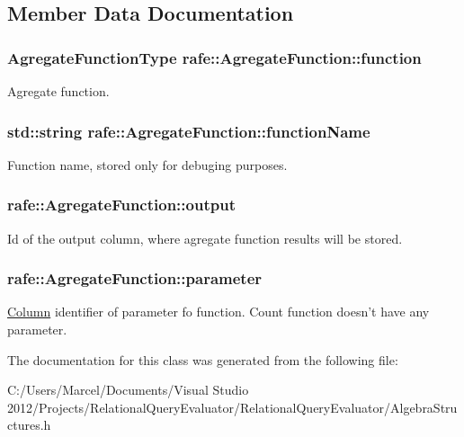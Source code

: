 \subsection{Member Data Documentation}
\hypertarget{classrafe_1_1_agregate_function_a9055ffba2605e99d0ca5362b9b5c7437}{
\subsubsection[{function}]{\setlength{\rightskip}{0pt plus 5cm}Agregate\+Function\+Type rafe\+::\+Agregate\+Function\+::function}}\label{classrafe_1_1_agregate_function_a9055ffba2605e99d0ca5362b9b5c7437}
Agregate function. \hypertarget{classrafe_1_1_agregate_function_a0b3dc806bca42c5ce5525441025166f0}{
\subsubsection[{function\+Name}]{\setlength{\rightskip}{0pt plus 5cm}std\+::string rafe\+::\+Agregate\+Function\+::function\+Name}}\label{classrafe_1_1_agregate_function_a0b3dc806bca42c5ce5525441025166f0}
Function name, stored only for debuging purposes. \hypertarget{classrafe_1_1_agregate_function_ad01da78516417600b5fa40418a5d2cb6}{
\subsubsection[{output}]{ rafe\+::\+Agregate\+Function\+::output}}\label{classrafe_1_1_agregate_function_ad01da78516417600b5fa40418a5d2cb6}
Id of the output column, where agregate function results will be stored. \hypertarget{classrafe_1_1_agregate_function_ab7cc5507a807035e2a35fbba2fc650d6}{
\subsubsection[{parameter}]{ rafe\+::\+Agregate\+Function\+::parameter}}\label{classrafe_1_1_agregate_function_ab7cc5507a807035e2a35fbba2fc650d6}
\hyperlink{classrafe_1_1_column}{Column} identifier of parameter fo function. Count function doesn't have any parameter. 

The documentation for this class was generated from the following file\+:\begin{DoxyCompactItemize}
\item 
C\+:/\+Users/\+Marcel/\+Documents/\+Visual Studio 2012/\+Projects/\+Relational\+Query\+Evaluator/\+Relational\+Query\+Evaluator/Algebra\+Structures.\+h\end{DoxyCompactItemize}
